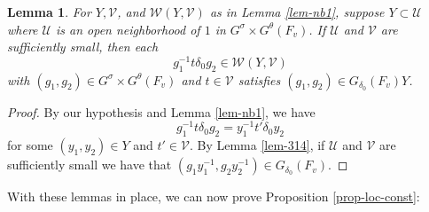 \documentclass[12pt]{amsart}
\newtheorem{lem}[thm]{Lemma}
\theoremstyle{remark}
\numberwithin{equation}{section}
\theoremstyle{definition}
\numberwithin{equation}{subsection}
\begin{document}
\begin{lem} \label{lem-last} For $Y,\mathcal{V}$, and $\mathcal{W}(Y,\mathcal{V})$
as in Lemma \ref{lem-nb1}, suppose $Y \subset \mathcal{U}$ where $\mathcal{U}$ is an
open neighborhood of $1$ in $G^{\sigma} \times G^{\theta}(F_v)$.  If
$\mathcal{U}$ and $\mathcal{V}$ are sufficiently small, then each
$$
g_1^{-1}t\delta_0 g_2 \in \mathcal{W}(Y,\mathcal{V})
$$
with $(g_1,g_2) \in G^{\sigma} \times G^{\theta}(F_v)$ and $t \in
\mathcal{V}$ satisfies $(g_1,g_2) \in G_{\delta_0}(F_v)Y$.

\end{lem}

\begin{proof} By our hypothesis and Lemma \ref{lem-nb1}, we have
$$
g_1^{-1}t\delta_0g_2=y_1^{-1}t'\delta_0y_2
$$
for some $(y_1,y_2) \in Y$ and $t' \in \mathcal{V}$.  By Lemma \ref{lem-314}, if $\mathcal{U}$ and $\mathcal{V}$ are sufficiently small we have that
$(g_1y_1^{-1},g_2y_2^{-1}) \in G_{\delta_0}(F_v)$.
\end{proof}

With these lemmas in place, we can now prove Proposition \ref{prop-loc-const}:
\end{document}
